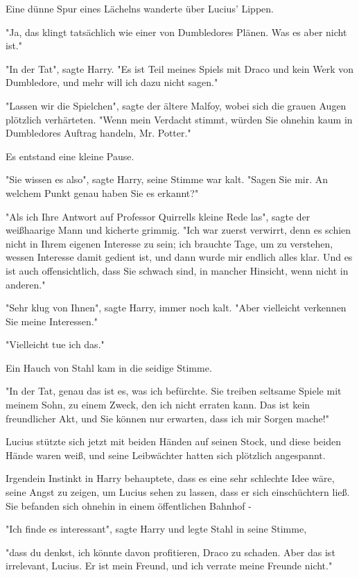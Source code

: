 {Eine dünne Spur eines Lächelns wanderte über Lucius' Lippen.

"Ja, das klingt tatsächlich wie einer von Dumbledores Plänen. Was es aber nicht ist."

"In der Tat", sagte Harry. "Es ist Teil meines Spiels mit Draco und kein Werk von Dumbledore, und mehr will ich dazu nicht sagen."

"Lassen wir die Spielchen", sagte der ältere Malfoy, wobei sich die grauen Augen plötzlich verhärteten. "Wenn mein Verdacht stimmt, würden Sie ohnehin kaum in Dumbledores Auftrag handeln, Mr. Potter."

Es entstand eine kleine Pause.

"Sie wissen es also", sagte Harry, seine Stimme war kalt. "Sagen Sie mir. An welchem Punkt genau haben Sie es erkannt?"

"Als ich Ihre Antwort auf Professor Quirrells kleine Rede las", sagte der weißhaarige Mann und kicherte grimmig. "Ich war zuerst verwirrt, denn es schien nicht in Ihrem eigenen Interesse zu sein; ich brauchte Tage, um zu verstehen, wessen Interesse damit gedient ist, und dann wurde mir endlich alles klar. Und es ist auch offensichtlich, dass Sie schwach sind, in mancher Hinsicht, wenn nicht in anderen."

"Sehr klug von Ihnen", sagte Harry, immer noch kalt. "Aber vielleicht verkennen Sie meine Interessen."

"Vielleicht tue ich das."

Ein Hauch von Stahl kam in die seidige Stimme.

"In der Tat, genau das ist es, was ich befürchte. Sie treiben seltsame Spiele mit meinem Sohn, zu einem Zweck, den ich nicht erraten kann. Das ist kein freundlicher Akt, und Sie können nur erwarten, dass ich mir Sorgen mache!"

Lucius stützte sich jetzt mit beiden Händen auf seinen Stock, und diese beiden Hände waren weiß, und seine Leibwächter hatten sich plötzlich angespannt.

Irgendein Instinkt in Harry behauptete, dass es eine sehr schlechte Idee wäre, seine Angst zu zeigen, um Lucius sehen zu lassen, dass er sich einschüchtern ließ. Sie befanden sich ohnehin in einem öffentlichen Bahnhof -

"Ich finde es interessant", sagte Harry und legte Stahl in seine Stimme,

"dass du denkst, ich könnte davon profitieren, Draco zu schaden. Aber das ist irrelevant, Lucius. Er ist mein Freund, und ich verrate meine Freunde nicht."

}
